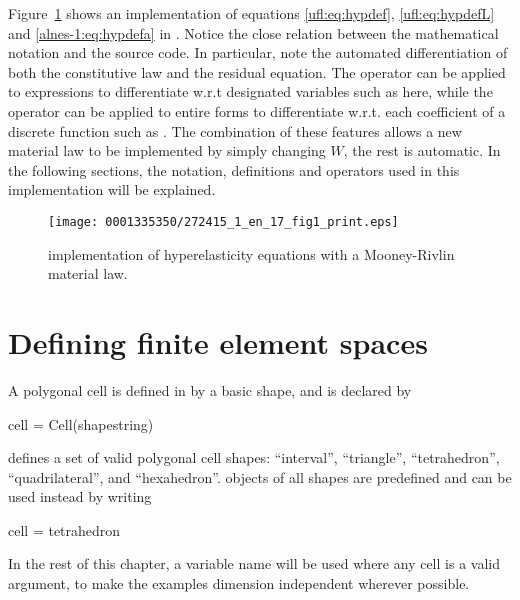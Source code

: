 Figure~\ref{ufl:fig:hypcode} shows an implementation of equations
\eqref{ufl:eq:hypdef}, \eqref{ufl:eq:hypdefL} and \eqref{alnes-1:eq:hypdefa}
in \ufl{}.  Notice the close relation between the mathematical notation
and the \ufl{} source code. In particular, note the automated
differentiation of both the constitutive law and the residual
equation. The operator  can be applied to expressions
to differentiate w.r.t designated variables such as  here,
while the operator  can be applied to entire forms
to differentiate w.r.t. each coefficient of a discrete function such
as .  The combination of these features allows a new material
law to be implemented by simply changing $W$, the rest is automatic.
In the following sections, the notation, definitions and operators used
in this implementation will be explained.

\begin{figure}
\bwfig
\texttt{[image: 0001335350/272415\_1\_en\_17\_fig1\_print.eps]}
\caption{\ufl{} implementation of hyperelasticity equations with a
Mooney-Rivlin material law.}\label{ufl:fig:hypcode}\vspace*{4pt}
\end{figure}

\section{Defining finite element spaces} \label{ufl:sec:elements}
A polygonal cell is defined in \ufl{} by a basic shape, and is declared by
\begin{uflcode}
cell = Cell(shapestring)
\end{uflcode}
\ufl{} defines a set of valid polygonal cell shapes: ``interval'',
``triangle'', ``tetrahedron'', ``quadrilateral'', and ``hexahedron''.
 objects of all shapes are predefined and can be used
instead by writing
\begin{uflcode}
cell = tetrahedron
\end{uflcode}
In the rest of this chapter, a variable name  will be used
where any cell is a valid argument, to make the examples dimension
independent wherever possible.

